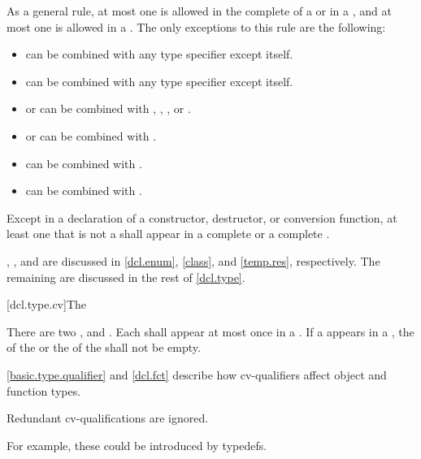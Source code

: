\pnum
As a general rule, at most one
is allowed in the complete
 of a  or in a
,
and at most one
is allowed in a
.
The only exceptions to this rule are the following:
\begin{itemize}
\item {} can be combined with any type specifier except itself.

\item {} can be combined with any type specifier except itself.

\item {} or  can be combined with
, , , or .

\item {} or  can be combined with .

\item {} can be combined with .

\item {} can be combined with .
\end{itemize}

\pnum
Except in a declaration of a constructor, destructor, or conversion
function, at least one  that is not a
 shall appear in a complete
 or a complete
.

\pnum
\begin{note}
,
,
and
are discussed
in
\ref{dcl.enum},
\ref{class},
and
\ref{temp.res}, respectively. The remaining
 are discussed in the rest of \ref{dcl.type}.
\end{note}

[dcl.type.cv]{The }%
%
%
%

\pnum
There are two ,  and
. Each  shall appear at most once in
a . If a  appears in a
,
the  of the  or
the  of the 
shall not be empty.
\begin{note}
\ref{basic.type.qualifier} and \ref{dcl.fct} describe how cv-qualifiers affect object and
function types.
\end{note}
Redundant cv-qualifications are ignored.
\begin{note}
For example,
these could be introduced by typedefs.
\end{note}

